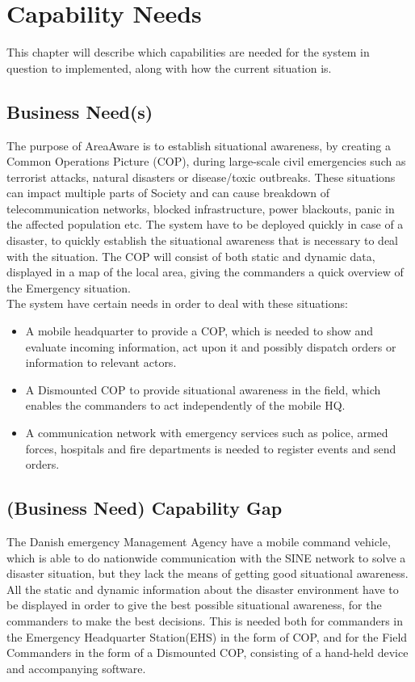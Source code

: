\chapter{Capability Needs}
\label{chp_need}

This chapter will describe which capabilities are needed for the system in question to implemented, along with how the current situation is.

\section{Business Need(s)}
The purpose of AreaAware is to establish situational awareness, by creating a Common Operations Picture (COP), during large-scale civil emergencies such as terrorist attacks, natural disasters or disease/toxic outbreaks. These situations can impact multiple parts of Society and can cause breakdown of telecommunication networks, blocked infrastructure, power blackouts, panic in the affected population etc. The system have to be deployed quickly in case of a disaster, to quickly establish the situational awareness that is necessary to deal with the situation. The COP will consist of both static and dynamic data, displayed in a map of the local area, giving the commanders a quick overview of the Emergency situation. \\

\noindent The system have certain needs in order to deal with these situations:
\begin{itemize}
	\itemsep0em
	\item A mobile headquarter to provide a COP, which is needed to show and evaluate incoming information, act upon it and possibly dispatch orders or information to relevant actors.
	\item A Dismounted COP to provide situational awareness in the field, which enables the commanders to act independently of the mobile HQ.
	\item A communication network with emergency services such as police, armed forces, hospitals and fire departments is needed to register events and send orders.
\end{itemize}

\section{(Business Need) Capability Gap}
The Danish emergency Management Agency have a mobile command vehicle, which is able to do nationwide communication with the SINE network to solve a disaster situation, but they lack the means of getting good situational awareness. All the static and dynamic information about the disaster environment have to be displayed in order to give the best possible situational awareness, for the commanders to make the best decisions. This is needed both for commanders in the Emergency Headquarter Station(EHS) in the form of COP, and for the Field Commanders in the form of a Dismounted COP, consisting of a hand-held device and accompanying software.

